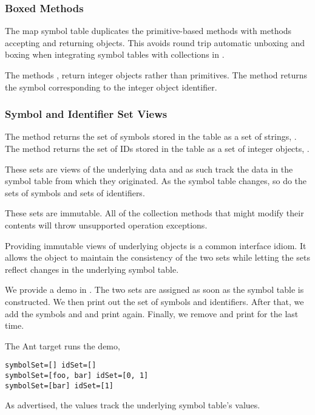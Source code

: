 \subsubsection{Boxed Methods}

The map symbol table duplicates the primitive-based 
methods with methods accepting and returning  objects.
This avoids round trip automatic unboxing and boxing when integrating
symbol tables with collections in .  

The methods ,
 return integer objects rather than
primitives.  The method  returns the symbol
corresponding to the integer object identifier.


\subsubsection{Symbol and Identifier Set Views}

The method  returns the set of symbols stored in the
table as a set of strings, .  The method
 returns the set of IDs stored in the table as a set of
integer objects, .  

These sets are views of the underlying data and as such track the data
in the symbol table from which they originated.  As the symbol table
changes, so do the sets of symbols and sets of identifiers.  

These sets are immutable.  All of the collection methods that might
modify their contents will throw unsupported operation exceptions.

Providing immutable views of underlying objects is a common interface
idiom.  It allows the object to maintain the consistency of the two
sets while letting the sets reflect changes in the underlying symbol
table.

We provide a demo in .  
%
%
The two sets are assigned as soon as the symbol table is constructed.
We then print out the set of symbols and identifiers.  After that, we
add the symbols  and  and print again.  
Finally, we remove  and print for the last time.

The Ant target  runs the demo,
%
\begin{verbatim}
symbolSet=[] idSet=[]
symbolSet=[foo, bar] idSet=[0, 1]
symbolSet=[bar] idSet=[1]
\end{verbatim}
%
As advertised, the values track the underlying symbol table's values.


